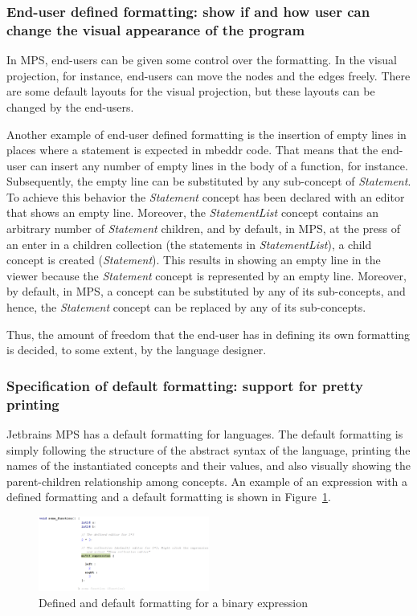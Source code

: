 \documentclass[preprint,numbers,10pt]{sigplanconf}
\begin{document}
\subsubsection{End-user defined formatting: show if and how user can change the visual appearance of the program}
In MPS, end-users can be given some control over the formatting. In the visual projection, for instance,
end-users can move the nodes and the edges freely. There are some default layouts for the visual projection, but these
layouts can be changed by the end-users.

Another example of end-user defined formatting is the insertion of
empty lines in places where a statement is expected in mbeddr code. That means that the end-user can insert any number
of empty lines in the body of a function, for instance. Subsequently, the empty line can be substituted by any sub-concept of \emph{Statement}.
To achieve this behavior the \emph{Statement} concept has been declared with an editor that shows an empty line.
Moreover, the \emph{StatementList} concept contains an arbitrary number of \emph{Statement} children, and by default,
in MPS, at the press of an enter in a children collection (the statements in \emph{StatementList}), a child concept is created (\emph{Statement}).
This results in showing an empty line in the viewer because the \emph{Statement} concept is represented by an empty line.
Moreover, by default, in MPS, a concept can be substituted by any of its sub-concepts, and hence,
the \emph{Statement} concept can be replaced by any of its sub-concepts.

Thus, the amount of freedom that the end-user has in defining its own formatting
is decided, to some extent, by the language designer.

\subsubsection{Specification of default formatting: support for pretty printing}
Jetbrains MPS has a default formatting for languages. The default formatting is simply following
the structure of the abstract syntax of the language, printing the names of the instantiated concepts and
their values, and also visually showing the parent-children relationship among concepts.
An example of an expression with a defined formatting and
a default formatting is shown in Figure~\ref{fig:DefaultEditor}.

\begin{figure}[H]
	\centering
	\includegraphics[width=0.50\textwidth]{screens/DefaultEditor.png}
	\caption{Defined and default formatting for a binary expression}
	\label{fig:DefaultEditor}
\end{figure}
\end{document}
